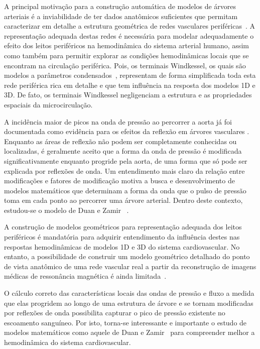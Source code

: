 \documentclass[
        english,			
        brazil			        %
        ,<...>]{abntbibufjf}
\begin{document}
A principal motivação para a construção automática de modelos de árvores arteriais é a inviabilidade de ter dados anatômicos suficientes que permitam caracterizar em detalhe a estrutura geométrica de redes vasculares periféricas~\cite{Queiroz2013}. A representação adequada destas redes é necessária para modelar adequadamente o efeito dos leitos periféricos na hemodinâmica do sistema arterial humano, assim como também para permitir explorar as condições hemodinâmicas locais que se encontram na circulação periférica. Pois, os terminais Windkessel, os quais são modelos a parâmetros condensados~\cite{Stergiopulos1992}, representam de forma simplificada toda esta rede periférica rica em detalhe e que tem influência na resposta dos modelos 1D e 3D. De fato, os terminais Windkessel negligenciam a estrutura e as propriedades espaciais da microcirculação. 

A incidência maior de picos na onda de pressão ao percorrer a aorta já foi documentada como evidência para os efeitos da reflexão em árvores vasculares \cite{Kouchoukos,Lighthill,McDonald}. Enquanto as áreas de reflexão não podem ser completamente conhecidas ou localizadas, é geralmente aceito que a forma da onda de pressão é modificada significativamente enquanto progride pela aorta, de uma forma que só pode ser explicada por reflexões de onda.  Um entendimento mais claro da relação entre modificações e fatores de modificação motiva a busca e desenvolvimento de modelos matemáticos que determinam a forma da onda que o pulso de pressão toma em cada ponto ao percorrer uma árvore arterial. Dentro deste contexto, estudou-se o modelo de Duan e Zamir ~\cite{Duan}.

A construção de modelos geométricos para representação adequada dos leitos periféricos é mandatória para adquirir entendimento da influência destes nas respostas hemodinâmicas de modelos 1D e 3D do sistema cardiovascular. No entanto, a possibilidade de construir um modelo geométrico detalhado do ponto de vista anatômico de uma rede vascular real a partir da reconstrução de imagens médicas de ressonância magnética é ainda limitada~\cite{Harel2010}.

O cálculo correto das características locais das ondas de pressão e fluxo a medida que elas progridem ao longo de uma estrutura de árvore e se tornam modificadas por reflexões de onda possibilita capturar o pico de pressão existente no escoamento sanguíneo. Por isto, torna-se interessante e importante o estudo de modelos matemáticos como aquele de Duan e Zamir~\cite{Duan} para compreender melhor a hemodinâmica do sistema cardiovascular.
\end{document}
